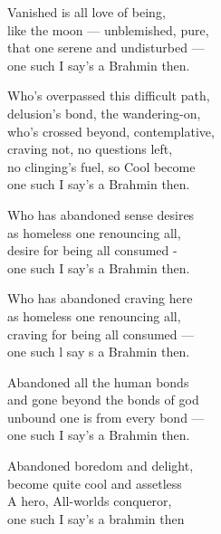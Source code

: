 \begin{MyDescription}{}
Vanished is all love of being,\\
like the moon — unblemished, pure,\\
that one serene and undisturbed —\\
one such I say's a Brahmin then.
\end{MyDescription}

\begin{MyDescription}{}
Who's overpassed this difficult path,\\
delusion's bond, the wandering-on,\\
who's crossed beyond, contemplative,\\
craving not, no questions left,\\
no clinging's fuel, so Cool become\\
one such I say's a Brahmin then.
\end{MyDescription}

\begin{MyDescription}{}
Who has abandoned sense desires\\
as homeless one renouncing all,\\
desire for being all consumed -\\
one such I say's a Brahmin then.
\end{MyDescription}

\begin{MyDescription}{}
Who has abandoned craving here\\
as homeless one renouncing all,\\
craving for being all consumed —\\
one such l say s a Brahmin then.
\end{MyDescription}

\begin{MyDescription}{}
Abandoned all the human bonds\\
and gone beyond the bonds of god\\
unbound one is from every bond —\\
one such I say's a Brahmin then.
\end{MyDescription}

\begin{MyDescription}{}
Abandoned boredom and delight,\\
become quite cool and assetless\\
A hero, All-worlds conqueror,\\
one such I say's a brahmin then
\end{MyDescription}

